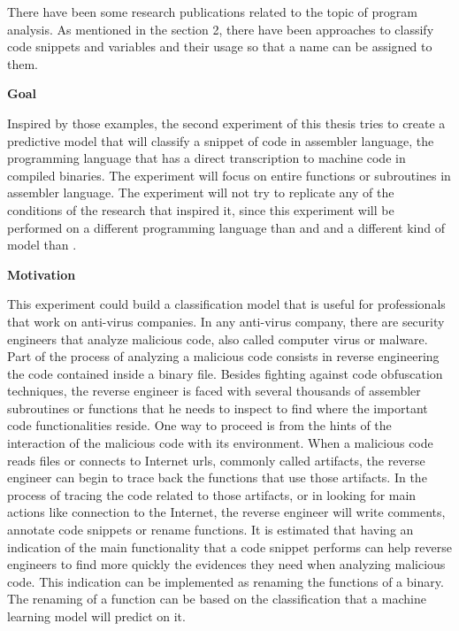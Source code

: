 There have been some research publications related to the topic of program analysis. As mentioned in the section 2, there have been approaches to classify code snippets \cite{code2vec} and variables \cite{139} and their usage so that a name can be assigned to them. 

\textbf{Goal}

Inspired by those examples, the second experiment of this thesis tries to create a predictive model that will classify a snippet of code in assembler language, the programming language that has a direct transcription to machine code in compiled binaries. The experiment will focus on entire functions or subroutines in assembler language. The experiment will not try to replicate any of the conditions of the research that inspired it, since this experiment will be performed on a different programming language than \cite{139} and \cite{code2vec} and a different kind of model than \cite{code2vec}.

\textbf{Motivation}

This experiment could build a classification model that is useful for professionals that work on anti-virus companies. In any anti-virus company, there are security engineers that analyze malicious code, also called computer virus or malware. Part of the process of analyzing a malicious code consists in reverse engineering the code contained inside a binary file. Besides fighting against code obfuscation techniques, the reverse engineer is faced with several thousands of assembler subroutines or functions that he needs to inspect to find where the important code functionalities reside. One way to proceed is from the hints of the interaction of the malicious code with its environment. When a malicious code reads files or connects to Internet urls, commonly called artifacts, the reverse engineer can begin to trace back the functions that use those artifacts. In the process of tracing the code related to those artifacts, or in looking for main actions like connection to the Internet, the reverse engineer will write comments, annotate code snippets or rename functions.
It is estimated that having an indication of the main functionality that a code snippet performs can help reverse engineers to find more quickly the evidences they need when analyzing malicious code. This indication can be implemented as renaming the functions of a binary. The renaming of a function can be based on the classification that a machine learning model will predict on it.



